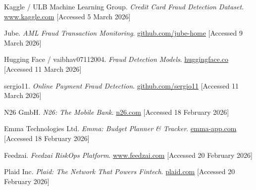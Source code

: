 \documentclass[12pt,a4paper]{report}
\begin{document}
\begin{enumerate}[label={[W\arabic*]},leftmargin=1.6cm,itemsep=1.5pt,parsep=0pt,topsep=2pt]
  \item {}\label{web:ulb}
        Kaggle / ULB Machine Learning Group. \textit{Credit Card Fraud Detection Dataset}.
        \href{https://www.kaggle.com/datasets/mlg-ulb/creditcardfraud}{www.kaggle.com}
        [Accessed 5 March 2026]

  \item {}\label{web:jube}
        Jube. \textit{AML Fraud Transaction Monitoring}.
        \href{https://github.com/jube-home/aml-fraud-transaction-monitoring}{github.com/jube-home}
        [Accessed 9 March 2026]

  \item {}\label{web:hf}
        Hugging Face / vaibhav07112004. \textit{Fraud Detection Models}.
        \href{https://huggingface.co/vaibhav07112004/fraud-detection-models}%
        {huggingface.co} [Accessed 11 March 2026]

  \item {}\label{web:sergio}
        sergio11. \textit{Online Payment Fraud Detection}.
        \href{https://github.com/sergio11/online_payment_fraud}{github.com/sergio11}
        [Accessed 11 March 2026]

  \item {}\label{web:n26}
        N26 GmbH. \textit{N26: The Mobile Bank}.
        \href{https://n26.com/en-eu}{n26.com} [Accessed 18 February 2026]

  \item {}\label{web:emma}
        Emma Technologies Ltd. \textit{Emma: Budget Planner \& Tracker}.
        \href{https://emma-app.com/}{emma-app.com} [Accessed 18 February 2026]

  \item {}\label{web:feedzai}
        Feedzai. \textit{Feedzai RiskOps Platform}.
        \href{https://www.feedzai.com/}{www.feedzai.com} [Accessed 20 February 2026]

  \item {}\label{web:plaid}
        Plaid Inc. \textit{Plaid: The Network That Powers Fintech}.
        \href{https://plaid.com/}{plaid.com} [Accessed 20 February 2026]

\end{enumerate}
\end{document}
